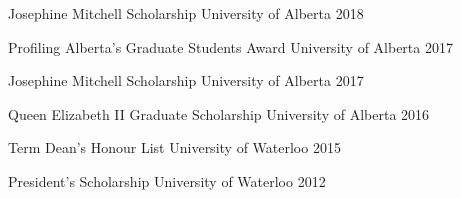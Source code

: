 \begin{cvhonors}
    \cvhonor
    {Josephine Mitchell Scholarship}
    {University of Alberta}
    {2018}


  \cvhonor
    {Profiling Alberta's Graduate Students Award}
    {University of Alberta}
    {2017}


  \cvhonor
    {Josephine Mitchell Scholarship}
    {University of Alberta}
    {2017}


  \cvhonor
    {Queen Elizabeth II Graduate Scholarship}
    {University of Alberta}
    {2016}


  \cvhonor
    {Term Dean's Honour List}
    {University of Waterloo}
    {2015}


  \cvhonor
    {President's Scholarship}
    {University of Waterloo}
    {2012}


\end{cvhonors}
